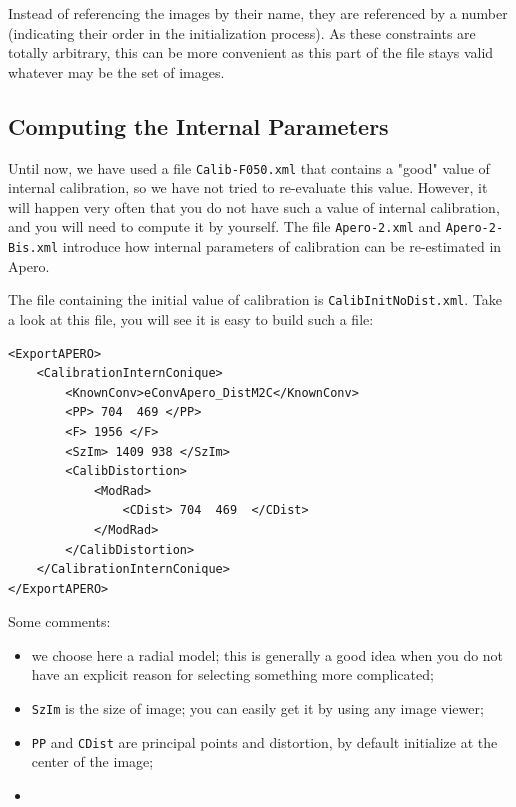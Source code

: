 Instead of referencing the images by their name, they are referenced
by a number (indicating their order in the initialization process).
As these constraints are totally
arbitrary, this can be more convenient as this  part
of the file stays valid whatever may be the set of images.


\subsection{Computing the Internal Parameters}

Until now, we have used a file {\tt Calib-F050.xml} that contains a
"good" value of internal calibration, so we have not tried to re-evaluate
this value. However, it will happen very often that you do not have
such a value of internal calibration, and you will need to compute it
by yourself.
The file {\tt Apero-2.xml} and {\tt Apero-2-Bis.xml} introduce how internal
parameters of calibration can be re-estimated in Apero.

The file containing the initial value  of calibration is {\tt CalibInitNoDist.xml}.
Take a look at this file, you will see it is easy to build such a file:

{\scriptsize
\begin{verbatim}
<ExportAPERO>
    <CalibrationInternConique>
        <KnownConv>eConvApero_DistM2C</KnownConv>
        <PP> 704  469 </PP>
        <F> 1956 </F>
        <SzIm> 1409 938 </SzIm>
        <CalibDistortion>
            <ModRad>
                <CDist> 704  469  </CDist>
            </ModRad>
        </CalibDistortion>
    </CalibrationInternConique>
</ExportAPERO>
\end{verbatim}
}

Some comments:

\begin{itemize}
   \item we choose here a radial model; this is generally a good idea when you do not have
         an explicit reason for selecting something more complicated;

   \item {\tt SzIm} is the size of image; you can easily get it by using any image viewer;

   \item {\tt PP} and {\tt CDist} are principal points and distortion, by default initialize
         at the center of the image;

   \item {}

\end{itemize}

